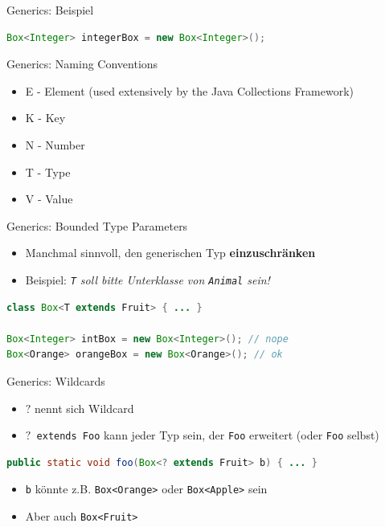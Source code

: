 \documentclass[18pt]{beamer}
\begin{document}
\begin{frame}[fragile]{Generics: Beispiel}
    \begin{lstlisting}[language=Java]
Box<Integer> integerBox = new Box<Integer>();
    \end{lstlisting}

\end{frame}

\begin{frame}{Generics: Naming Conventions}
    \begin{itemize}
        \item E - Element (used extensively by the Java Collections Framework)
        \item K - Key
        \item N - Number
        \item T - Type
        \item V - Value
    \end{itemize}
\end{frame}

\begin{frame}[fragile]{Generics: Bounded Type Parameters}
    \begin{itemize}
        \item Manchmal sinnvoll, den generischen Typ \textbf{einzuschränken}
        \item Beispiel: \textit{\texttt{T} soll bitte Unterklasse von \texttt{Animal} sein!}
    \end{itemize}

    \begin{lstlisting}[language=Java]
class Box<T extends Fruit> { ... }

Box<Integer> intBox = new Box<Integer>(); // nope
Box<Orange> orangeBox = new Box<Orange>(); // ok
    \end{lstlisting}

\end{frame}


\begin{frame}[fragile]{Generics: Wildcards}
    \begin{itemize}
        \item $?$ nennt sich Wildcard
        \item \texttt{$?$ extends Foo} kann jeder Typ sein, der \texttt{Foo} erweitert (oder \texttt{Foo} selbst)

    \end{itemize}
    \begin{lstlisting}[language=Java]
public static void foo(Box<? extends Fruit> b) { ... }
    \end{lstlisting}

    \begin{itemize}
        \item \texttt{b} könnte z.B. \texttt{Box<Orange>} oder \texttt{Box<Apple>} sein
        \item Aber auch \texttt{Box<Fruit>}
    \end{itemize}
\end{frame}
\end{document}

